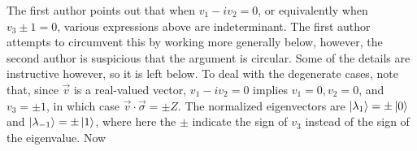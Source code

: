 \begin{comment}
(ii) If $\lambda = -1$.
\begin{align*}
	\vec{v} \cdot \vec{\sigma}  - \lambda I &= \vec{v} \cdot \vec{\sigma}  + I\\
	&= \begin{bmatrix}
		v_3 + 1 & v_1 - i v_2 \\
		v_1 + i v_2 & - v_3 + 1
	\end{bmatrix}
\end{align*}

Normalized eigenvalue is 


\begin{align*}
	\kb{\lambda_{-1}} &= \frac{1 - v_3}{2} \begin{bmatrix}
	1 \\
	- \frac{1+v_3}{v_1 - iv_2}
	\end{bmatrix}
	\begin{bmatrix}
		1 & - \frac{1+v_3}{v_1 + iv_2}
	\end{bmatrix}\\
	&=
	\frac{1 - v_3}{2} \begin{bmatrix}
		1 & - \frac{v_1 - iv_2}{1 - v_3} \\
		- \frac{v_1 + iv_2}{1 - v_3} & \frac{1+v_3}{1 - v_3}
	\end{bmatrix} \\
	&=
	\frac{1}{2} \begin{bmatrix}
		1 - v_3 & -(v_1 - iv_2) \\
		- (v_1 + iv_2) & 1 + v_3
	\end{bmatrix} \\
	&=
	\frac{1}{2} \left( I - \begin{bmatrix}
		v_3 & v_1 - iv_2 \\
		(v_1 + iv_2 & - v_3
	\end{bmatrix} \right)\\
	&= \frac{1}{2} (I - \vec{v} \cdot \vec{\sigma} ).
\end{align*}
\end{comment}
The first author points out that when $v_1-iv_2 = 0$, or equivalently when $v_3\pm1 = 0$, various expressions above are indeterminant.  The first author attempts to circumvent this by working more generally below, however, the second author is suspicious that the argument is circular.  Some of the details are instructive however, so it is left below.  To deal with the degenerate cases, note that, since $\vec{v}$ is a real-valued vector, $v_1-iv_2=0$ implies $v_1=0, v_2=0$, and $v_3=\pm 1$, in which case $\vec{v}\cdot\vec{\sigma} = \pm Z$.  The normalized eigenvectors are $\ket{\lambda_1} = \pm\ket{0}$ and $\ket{\lambda_{-1}}=\pm\ket{1}$, where here the $\pm$ indicate the sign of $v_3$ instead of the sign of the eigenvalue.  Now
